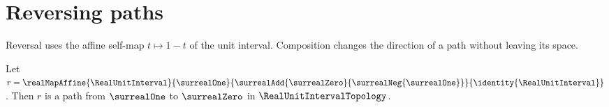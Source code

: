 \section{Reversing paths}



Reversal uses the affine self-map $t\mapsto1-t$ of the unit interval.
Composition changes the direction of a path without leaving its space.

\begin{theorem}\label{unit_interval_reverse_path}
    Let $r=\realMapAffine{\RealUnitInterval}{\surrealOne}
        {\surrealAdd{\surrealZero}{\surrealNeg{\surrealOne}}}{\identity{\RealUnitInterval}}$.
    Then $r$ is a path from $\surrealOne$ to $\surrealZero$ in $\RealUnitIntervalTopology$.
\end{theorem}
